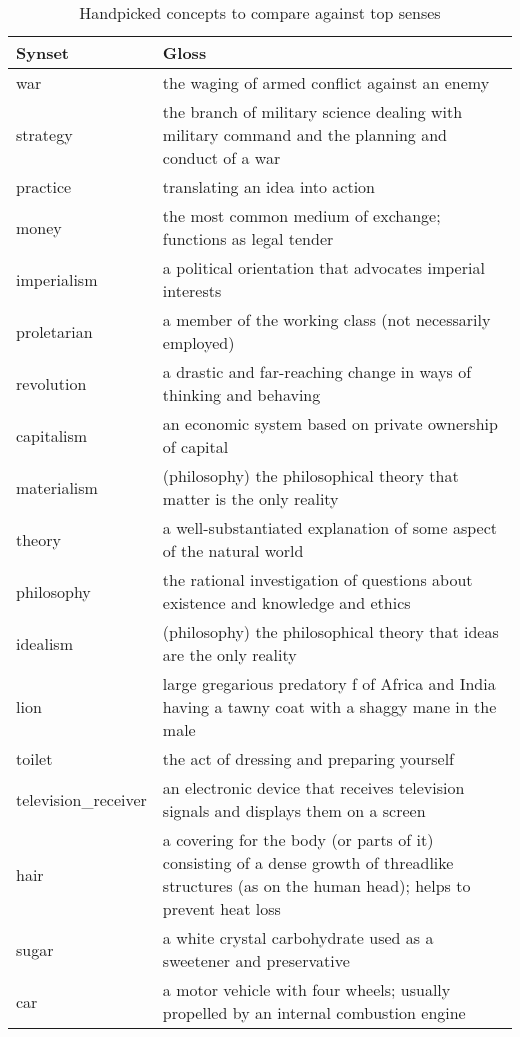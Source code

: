 
\begin{table*}[ht]
\caption*{Handpicked concepts to compare against top senses}
\centering
\begin{tabular}{ p{2.5cm} p{15cm} }
    \toprule
    Synset & Gloss \\
    \midrule
            war & the waging of armed conflict against an enemy \\
            strategy & the branch of military science dealing with military command and the planning and conduct of a war \\
            practice & translating an idea into action \\
            money & the most common medium of exchange; functions as legal tender \\
            imperialism & a political orientation that advocates imperial interests \\
            proletarian & a member of the working class (not necessarily employed) \\
            revolution & a drastic and far-reaching change in ways of thinking and behaving \\
            capitalism & an economic system based on private ownership of capital\\
            materialism & (philosophy) the philosophical theory that matter is the only reality \\
            theory & a well-substantiated explanation of some aspect of the natural world \\
            philosophy & the rational investigation of questions about existence and knowledge and ethics \\
            idealism & (philosophy) the philosophical theory that ideas are the only reality \\
            lion & large gregarious predatory f of Africa and India having a tawny coat with a shaggy mane in the male \\
            toilet & the act of dressing and preparing yourself \\
            television\_receiver & an electronic device that receives television signals and displays them on a screen \\
            hair & a covering for the body (or parts of it) consisting of a dense growth of threadlike structures (as on the human head); helps to prevent heat loss \\
            sugar & a white crystal carbohydrate used as a sweetener and preservative \\
            car & a motor vehicle with four wheels; usually propelled by an internal combustion engine \\

    \bottomrule
\end{tabular}

\end{table*}
